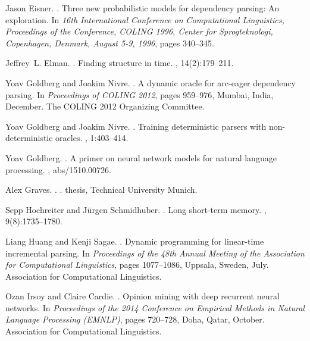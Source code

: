 \documentclass[11pt]{article}
\begin{document}
\begin{thebibliography}{}
Jason Eisner.
.
\newblock Three new probabilistic models for dependency parsing: An
  exploration.
\newblock In {\em 16th International Conference on Computational Linguistics,
  Proceedings of the Conference, {COLING} 1996, Center for Sprogteknologi,
  Copenhagen, Denmark, August 5-9, 1996}, pages 340--345.

Jeffrey~L. Elman.
.
\newblock Finding structure in time.
, 14(2):179--211.

Yoav Goldberg and Joakim Nivre.
.
\newblock A dynamic oracle for arc-eager dependency parsing.
\newblock In {\em Proceedings of COLING 2012}, pages 959--976, Mumbai, India,
  December. The COLING 2012 Organizing Committee.

Yoav Goldberg and Joakim Nivre.
.
\newblock Training deterministic parsers with non-deterministic oracles.
,
  1:403--414.

Yoav Goldberg.
.
\newblock A primer on neural network models for natural language processing.
, abs/1510.00726.

Alex Graves.
.
.
 thesis, Technical University Munich.

Sepp Hochreiter and J{\"{u}}rgen Schmidhuber.
.
\newblock Long short-term memory.
, 9(8):1735--1780.

Liang Huang and Kenji Sagae.
.
\newblock Dynamic programming for linear-time incremental parsing.
\newblock In {\em Proceedings of the 48th Annual Meeting of the Association for
  Computational Linguistics}, pages 1077--1086, Uppsala, Sweden, July.
  Association for Computational Linguistics.

Ozan Irsoy and Claire Cardie.
.
\newblock Opinion mining with deep recurrent neural networks.
\newblock In {\em Proceedings of the 2014 Conference on Empirical Methods in
  Natural Language Processing (EMNLP)}, pages 720--728, Doha, Qatar, October.
  Association for Computational Linguistics.


\end{thebibliography}
\end{document}
